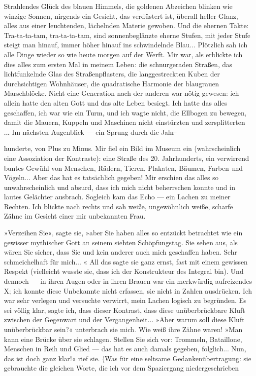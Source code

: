 Strahlendes Glück des blauen Himmels, die goldenen Abzeichen
blinken wie winzige Sonnen, nirgends ein Gesicht, das verdüstert
ist, überall heller Glanz, alles aus einer leuchtenden, lächelnden
Materie gewoben. Und die ehernen Takte: Tra-ta-ta-tam,
tra-ta-ta-tam, sind sonnenbeglänzte eherne Stufen, mit jeder Stufe
steigt man hinauf, immer höher hinauf ins schwindelnde Blau...
Plötzlich sah ich alle Dinge wieder so wie heute morgen auf der
Werft. Mir war, als erblickte ich dies alles zum ersten Mal in
meinem Leben: die schnurgeraden Straßen, das lichtfunkelnde Glas
des Straßenpflasters, die langgestreckten Kuben der durchsichtigen
Wohnhäuser, die quadratische Harmonie der blaugrauen Marschblöcke.
Nicht eine Generation nach der anderen war nötig gewesen: ich
allein hatte den alten Gott und das alte Leben besiegt. Ich hatte
das alles geschaffen, ich war wie ein Turm, und ich wagte nicht,
die Ellbogen zu bewegen, damit die Mauern, Kuppeln und Maschinen
nicht einstürzten und zersplitterten ... Im nächsten Augenblick —
ein Sprung durch die Jahr-

hunderte, von Plus zu Minus. Mir fiel ein Bild im Museum ein
(wahrscheinlich eine Assoziation der Kontraste): eine Straße des
20. Jahrhunderts, ein verwirrend buntes Gewühl von Menschen,
Rädern, Tieren, Plakaten, Bäumen, Farben und Vögeln... Aber das hat
es tatsächlich gegeben! Mir erschien das alles so unwahrscheinlich
und absurd, dass ich mich nicht beherrschen konnte und in lautes
Gelächter ausbrach. Sogleich kam das Echo — ein Lachen zu meiner
Rechten. Ich blickte nach rechts und sah weiße, ungewöhnlich weiße,
scharfe Zähne im Gesicht einer mir unbekannten Frau.

»Verzeihen Sie«, sagte sie, »aber Sie haben alles so entzückt
betrachtet wie ein gewisser mythischer Gott an seinem siebten
Schöpfungstag. Sie sehen aus, als wären Sie sicher, dass Sie und
kein anderer auch mich geschaffen haben. Sehr schmeichelhaft für
mich... « All das sagte sie ganz ernst, fast mit einem gewissen
Respekt (vielleicht wusste sie, dass ich der Konstrukteur des
Integral bin). Und dennoch — in ihren Augen oder in ihren Brauen
war ein merkwürdig aufreizendes X; ich konnte diese Unbekannte
nicht erfassen, sie nicht in Zahlen ausdrücken. Ich war sehr
verlegen und versuchte verwirrt, mein Lachen logisch zu begründen.
Es sei völlig klar, sagte ich, dass dieser Kontrast, dass diese
unüberbrückbare Kluft zwischen der Gegenwart und der
Vergangenheit... »Aber warum soll diese Kluft unüberbrückbar sein?«
unterbrach sie mich. Wie weiß ihre Zähne waren! »Man kann eine
Brücke über sie schlagen. Stellen Sie sich vor: Trommeln,
Bataillone, Menschen in Reih und Glied — das hat es auch damals
gegeben, folglich... Nun, das ist doch ganz klar!« rief sie. (Was
für eine seltsame Gedankenübertragung: sie gebrauchte die gleichen
Worte, die ich vor dem Spaziergang niedergeschrieben

